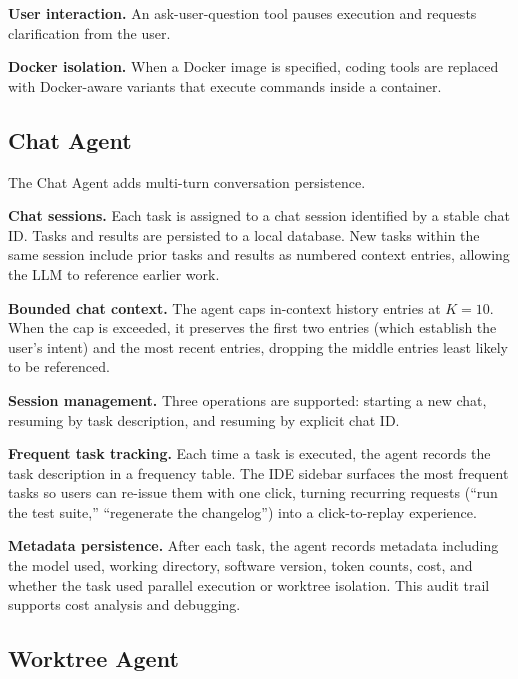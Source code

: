\documentclass{article}
\begin{document}
\textbf{User interaction.}  An ask-user-question tool pauses execution and requests clarification from the user.

\textbf{Docker isolation.}  When a Docker image is specified, coding tools are replaced with Docker-aware variants that execute commands inside a container.

\subsection{Chat Agent}
\label{sec:chat-agent}

The Chat Agent adds multi-turn conversation persistence.

\textbf{Chat sessions.}  Each task is assigned to a chat session identified by a stable chat ID.  Tasks and results are persisted to a local database.  New tasks within the same session include prior tasks and results as numbered context entries, allowing the LLM to reference earlier work.

\textbf{Bounded chat context.}  The agent caps in-context history entries at $K=10$.  When the cap is exceeded, it preserves the first two entries (which establish the user's intent) and the most recent entries, dropping the middle entries least likely to be referenced.

\textbf{Session management.}  Three operations are supported: starting a new chat, resuming by task description, and resuming by explicit chat ID.

\textbf{Frequent task tracking.}  Each time a task is executed, the agent records the task description in a frequency table.  The IDE sidebar surfaces the most frequent tasks so users can re-issue them with one click, turning recurring requests (``run the test suite,'' ``regenerate the changelog'') into a click-to-replay experience.

\textbf{Metadata persistence.}  After each task, the agent records metadata including the model used, working directory, software version, token counts, cost, and whether the task used parallel execution or worktree isolation.  This audit trail supports cost analysis and debugging.

\subsection{Worktree Agent}
\label{sec:worktree-agent}
\end{document}

